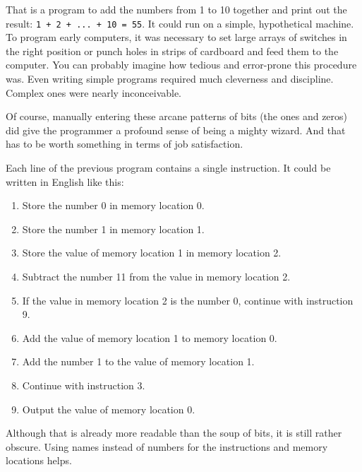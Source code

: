 That is a program to add the numbers from 1 to 10 together and print out the result: \lstinline`1 + 2 + ... + 10 = 55`. It could run on a simple, hypothetical machine. To program early computers, it was necessary to set large arrays of switches in the right position or punch holes in strips of cardboard and feed them to the computer. You can probably imagine how tedious and error-prone this procedure was. Even writing simple programs required much cleverness and discipline. Complex ones were nearly inconceivable.

Of course, manually entering these arcane patterns of bits (the ones and zeros) did give the programmer a profound sense of being a mighty wizard. And that has to be worth something in terms of job satisfaction.

Each line of the previous program contains a single instruction. It could be written in English like this:

\begin{enumerate}
\item 

Store the number 0 in memory location 0.
\item 

Store the number 1 in memory location 1.
\item 

Store the value of memory location 1 in memory location 2.
\item 

Subtract the number 11 from the value in memory location 2.
\item 

If the value in memory location 2 is the number 0, continue with instruction 9.
\item 

Add the value of memory location 1 to memory location 0.
\item 

Add the number 1 to the value of memory location 1.
\item 

Continue with instruction 3.
\item 

Output the value of memory location 0.
\end{enumerate}

Although that is already more readable than the soup of bits, it is still rather obscure. Using names instead of numbers for the instructions and memory locations helps.

